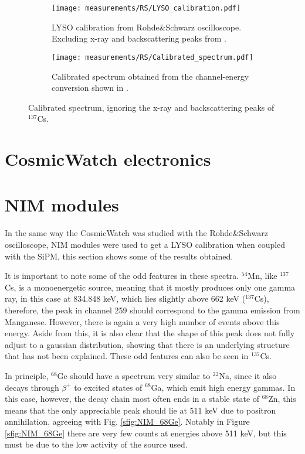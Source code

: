 \begin{figure}[H]
  \begin{subfigure}[t]{\textwidth}
    \centering
    \texttt{[image: measurements/RS/LYSO\_calibration.pdf]}
    \caption{\label{sfig:RS_LYSO_calibration}LYSO calibration from Rohde\&Schwarz oscilloscope. Excluding x-ray and backscattering peaks from .}
  \end{subfigure}
  \medskip
  \begin{subfigure}[t]{\textwidth}
    \centering
    \texttt{[image: measurements/RS/Calibrated\_spectrum.pdf]}
    \caption{\label{sfig:RS_LYSO_calibrated_spectrum}Calibrated spectrum obtained from the channel-energy conversion shown in .}
  \end{subfigure}
  \caption{\label{fig:RS_calibration}Calibrated spectrum, ignoring the x-ray and backscattering peaks of $^{137}$Cs.}
\end{figure}


\section{CosmicWatch electronics}

\section{NIM modules}

In the same way the CosmicWatch was studied with the Rohde\&Schwarz oscilloscope, NIM modules were used to get a LYSO calibration when coupled with the SiPM, this section shows some of the results obtained.

It is important to note some of the odd features in these spectra. $^{54}$Mn, like $^{137}$Cs, is a monoenergetic source, meaning that it mostly produces only one gamma ray, in this case at 834.848 \unit{\kilo\eV}, which lies slightly above 662 \unit{\kilo\eV} ($^{137}$Cs), therefore, the peak in channel 259 should correspond to the gamma emission from Manganese. However, there is again a very high number of events above this energy. Aside from this, it is also clear that the shape of this peak does not fully adjust to a gaussian distribution, showing that there is an underlying structure that has not been explained. These odd features can also be seen in $^{137}$Cs.

In principle, $^{68}$Ge should have a spectrum very similar to $^{22}$Na, since it also decays through $\beta^+$ to excited states of $^{68}$Ga, which emit high energy gammas. In this case, however, the decay chain most often ends in a stable state of $^{68}$Zn, this means that the only appreciable peak should lie at 511 \unit{\kilo\eV} due to positron annihilation, agreeing with Fig. \ref{sfig:NIM_68Ge}. Notably in Figure \ref{sfig:NIM_68Ge} there are very few counts at energies above 511 \unit{\kilo\eV}, but this must be due to the low activity of the source used. 

